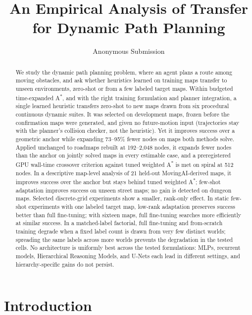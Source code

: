 \documentclass[letterpaper]{article} %
\title{An Empirical Analysis of Transfer for Dynamic Path Planning}
\author{
    Anonymous Submission
}
\begin{document}
\maketitle

\begin{abstract}
We study the dynamic path planning problem, where an agent plans a route among moving obstacles, and ask whether heuristics learned on training maps transfer to unseen environments, zero-shot or from a few labeled target maps. Within budgeted time-expanded A\textsuperscript{*}, and with the right training formulation and planner integration, a single learned heuristic transfers zero-shot to new maps drawn from six procedural continuous dynamic suites. It was selected on development maps, frozen before the confirmation maps were generated, and given no future-motion input (trajectories stay with the planner's collision checker, not the heuristic). Yet it improves success over a geometric anchor while expanding 73--95\% fewer nodes on maps both methods solve. Applied unchanged to roadmaps rebuilt at 192--2{,}048 nodes, it expands fewer nodes than the anchor on jointly solved maps in every estimable case, and a preregistered GPU wall-time crossover criterion against tuned weighted A\textsuperscript{*} is met on spiral at 512 nodes. In a descriptive map-level analysis of 21 held-out MovingAI-derived maps, it improves success over the anchor but stays behind tuned weighted A\textsuperscript{*}; few-shot adaptation improves success on unseen street maps; no gain is detected on dungeon maps. Selected discrete-grid experiments show a smaller, rank-only effect. In static few-shot experiments with one labeled target map, low-rank adaptation preserves success better than full fine-tuning; with sixteen maps, full fine-tuning searches more efficiently at similar success. In a matched-label factorial, full fine-tuning and from-scratch training degrade when a fixed label count is drawn from very few distinct worlds; spreading the same labels across more worlds prevents the degradation in the tested cells. No architecture is uniformly best across the tested formulations: MLPs, recurrent models, Hierarchical Reasoning Models, and U-Nets each lead in different settings, and hierarchy-specific gains do not persist.
\end{abstract}

\section{Introduction}
\end{document}
